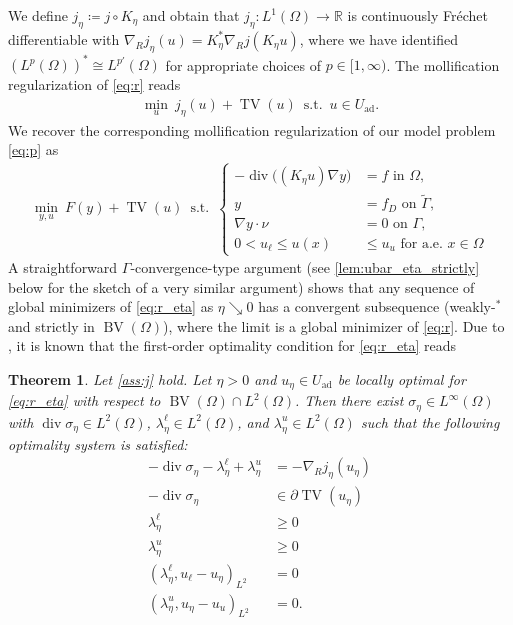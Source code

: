 \documentclass[11pt]{article}
\newcommand{\R}{\mathbb{R}}
\DeclareMathOperator*{\BV}{BV}
\DeclareMathOperator*{\TV}{TV}
\DeclareMathOperator*{\dvg}{div}
\newcommand{\feas}{U_{\textrm{ad}}}
\newtheorem{theorem}{Theorem}[section]
\theoremstyle{definition}
\theoremstyle{remark}
\begin{document}
We define $j_\eta \coloneqq j \circ K_\eta$ and obtain that
$j_\eta : L^1(\Omega) \to \R$ is continuously Fr\'{e}chet differentiable with
$\nabla_R j_\eta(u) = K_\eta^* \nabla_R j(K_\eta u)$, where
we have identified $(L^p(\Omega))^* \cong L^{p'}(\Omega)$ for appropriate choices
of $p \in [1,\infty)$. The mollification regularization of \eqref{eq:r} reads
%
\begin{gather}\label{eq:r_eta}
\min_{u}\ j_\eta(u) + \TV(u)
\ \operatorname{s.t.}\ u \in \feas.
\tag{P$_\eta'$}
\end{gather}
%
We recover the corresponding mollification regularization of our model problem 
\eqref{eq:p} as
%
\begin{gather}\label{eq:p_eta}
\min_{y,u}\ F(y) + \TV(u)
\ \operatorname{s.t.}\
\left\{
\begin{aligned}
- \dvg\big((K_\eta u) \nabla y\big) &= f \text{ in } \Omega, \\
y &= f_D \text{ on } \tilde{\Gamma}, \\
\nabla y \cdot \nu  &= 0  \text{ on } \Gamma, \\
0 < u_\ell \le u(x) &\le u_u \text{ for a.e.\ }x \in \Omega
\end{aligned}
\right.%
\tag{P$_\eta$}
\end{gather}
%
A straightforward $\Gamma$-convergence-type argument (see \cref{lem:ubar_eta_strictly} below for the sketch of
a very similar argument) shows that any sequence of global minimizers
of \eqref{eq:r_eta} as $\eta \searrow 0$ has a convergent subsequence (weakly-$^*$ and strictly
in $\BV(\Omega)$), where the limit is a global minimizer of \eqref{eq:r}.
Due to \cite{natemeyer2022penalty}, it is known that the first-order optimality
condition for \eqref{eq:r_eta} reads
%
\begin{theorem}
Let \cref{ass:j} hold.
Let $\eta > 0$ and $u_\eta \in \feas$ be locally optimal for \eqref{eq:r_eta} with respect to
$\BV(\Omega) \cap L^{2}(\Omega)$. Then there exist $\sigma_\eta \in L^\infty(\Omega)$ with
$\dvg \sigma_\eta \in L^2(\Omega)$, $\lambda^\ell_\eta \in L^2(\Omega)$, and $\lambda^u_\eta \in L^2(\Omega)$
such that the following optimality system is satisfied:
%
\begin{align*}
-\dvg \sigma_\eta - \lambda^\ell_\eta + \lambda^u_\eta &= -\nabla_R j_\eta(u_\eta) \\
-\dvg \sigma_\eta &\in \partial \TV (u_\eta) \\
\lambda^\ell_\eta &\ge 0 \\
\lambda^u_\eta &\ge 0 \\
(\lambda^\ell_\eta, u_\ell - u_\eta)_{L^2} &= 0\\
(\lambda^u_\eta, u_\eta - u_u)_{L^2} &= 0.
\end{align*}
\end{theorem}
\end{document}
